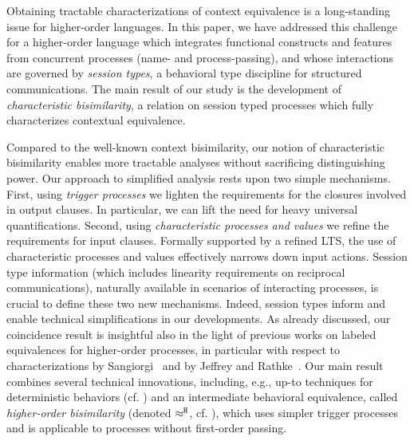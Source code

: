 
Obtaining tractable characterizations of context equivalence 
is a long-standing issue for higher-order  languages. 
In this paper, we have addressed this challenge for a higher-order language 
which integrates functional constructs and  features from concurrent processes (name- and process-passing), and 
whose interactions are governed by \emph{session types}, a behavioral type discipline for structured communications.
The main result of our study is the development of \emph{characteristic bisimilarity}, 
a relation on session typed processes which fully characterizes contextual equivalence.

Compared to 
the well-known 
context bisimilarity, our notion of 
characteristic bisimilarity 
enables more tractable analyses without sacrificing distinguishing power. 
Our approach to simplified analysis rests upon two simple mechanisms. 
First, 
using \emph{trigger processes} 
we lighten the requirements for the closures involved in output clauses. 
In particular, we can lift the need for heavy universal quantifications. 
Second, using \emph{characteristic processes and values} we refine the requirements for input clauses.
Formally supported by a refined LTS, the use of characteristic processes and values effectively narrows down
input actions.
Session type information (which includes linearity requirements on reciprocal communications), naturally available in scenarios of interacting processes, is crucial to define these two new mechanisms. Indeed, session types inform and enable technical simplifications in our developments.
As already discussed, our coincidence result is insightful also in the light of previous works on labeled equivalences 
for higher-order processes, in particular with respect to characterizations 
by Sangiorgi~\cite{SangiorgiD:expmpa,San96H} and by Jeffrey and Rathke~\cite{JeffreyR05}. Our main result 
combines several technical innovations, including, e.g., 
up-to techniques for deterministic behaviors (cf. )
and an intermediate behavioral equivalence, called \emph{higher-order bisimilarity}
(denoted $\approx^\mathtt{H}$, cf. ), which 
uses simpler trigger processes and 
is applicable to processes without first-order passing. 

